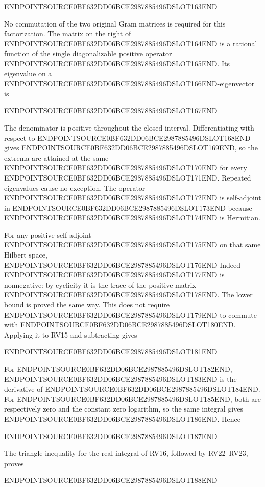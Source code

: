 ENDPOINTSOURCE0BF632DD06BCE2987885496DSLOT163END

No commutation of the two original Gram matrices is required for this factorization. The matrix on the right of ENDPOINTSOURCE0BF632DD06BCE2987885496DSLOT164END is a rational function of the single diagonalizable positive operator ENDPOINTSOURCE0BF632DD06BCE2987885496DSLOT165END. Its eigenvalue on a ENDPOINTSOURCE0BF632DD06BCE2987885496DSLOT166END-eigenvector is

ENDPOINTSOURCE0BF632DD06BCE2987885496DSLOT167END

The denominator is positive throughout the closed interval. Differentiating with respect to ENDPOINTSOURCE0BF632DD06BCE2987885496DSLOT168END gives ENDPOINTSOURCE0BF632DD06BCE2987885496DSLOT169END, so the extrema are attained at the same ENDPOINTSOURCE0BF632DD06BCE2987885496DSLOT170END for every ENDPOINTSOURCE0BF632DD06BCE2987885496DSLOT171END. Repeated eigenvalues cause no exception. The operator ENDPOINTSOURCE0BF632DD06BCE2987885496DSLOT172END is self-adjoint in ENDPOINTSOURCE0BF632DD06BCE2987885496DSLOT173END because ENDPOINTSOURCE0BF632DD06BCE2987885496DSLOT174END is Hermitian.

For any positive self-adjoint ENDPOINTSOURCE0BF632DD06BCE2987885496DSLOT175END on that same Hilbert space, ENDPOINTSOURCE0BF632DD06BCE2987885496DSLOT176END Indeed ENDPOINTSOURCE0BF632DD06BCE2987885496DSLOT177END is nonnegative: by cyclicity it is the trace of the positive matrix ENDPOINTSOURCE0BF632DD06BCE2987885496DSLOT178END. The lower bound is proved the same way. This does not require ENDPOINTSOURCE0BF632DD06BCE2987885496DSLOT179END to commute with ENDPOINTSOURCE0BF632DD06BCE2987885496DSLOT180END. Applying it to RV15 and subtracting gives

ENDPOINTSOURCE0BF632DD06BCE2987885496DSLOT181END

For ENDPOINTSOURCE0BF632DD06BCE2987885496DSLOT182END, ENDPOINTSOURCE0BF632DD06BCE2987885496DSLOT183END is the derivative of ENDPOINTSOURCE0BF632DD06BCE2987885496DSLOT184END. For ENDPOINTSOURCE0BF632DD06BCE2987885496DSLOT185END, both are respectively zero and the constant zero logarithm, so the same integral gives ENDPOINTSOURCE0BF632DD06BCE2987885496DSLOT186END. Hence

ENDPOINTSOURCE0BF632DD06BCE2987885496DSLOT187END

The triangle inequality for the real integral of RV16, followed by RV22--RV23, proves

ENDPOINTSOURCE0BF632DD06BCE2987885496DSLOT188END

